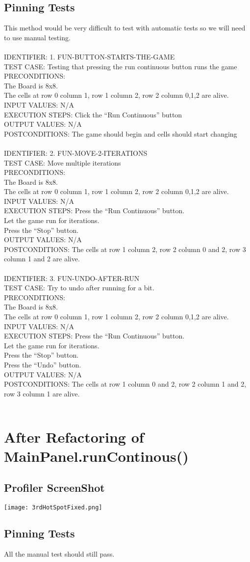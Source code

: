 \documentclass[titlepage]{article}
\newcommand{\testcase}[7]{IDENTIFIER: {#1}\\
TEST CASE: {#2}\\
PRECONDITIONS: {#3}\\
INPUT VALUES: {#4}\\
EXECUTION STEPS: {#5}\\
OUTPUT VALUES: {#6}\\
POSTCONDITIONS: {#7}\\
\\
}
\begin{document}
\subsection{Pinning Tests}
This method would be very difficult to test with automatic tests so we will need to use manual testing.\\
\\
\testcase
{1. FUN-BUTTON-STARTS-THE-GAME}
{Testing that pressing the run continuous button runs the game}
{\\
 The Board is 8x8.\\
 The cells at row 0 column 1, row 1 column 2, row 2 column 0,1,2 are alive.}
{N/A}
{Click the ``Run Continuous'' button}
{N/A}
{The game should begin and cells should start changing}
\testcase
{2. FUN-MOVE-2-ITERATIONS}
{Move multiple iterations}
{\\
 The Board is 8x8.\\
 The cells at row 0 column 1, row 1 column 2, row 2 column 0,1,2 are alive.}
{N/A}
{Press the ``Run Continuous'' button.\\
Let the game run for  iterations.\\
Press the ``Stop'' button.}
{N/A}
{The cells at row 1 column 2, row 2 column 0 and 2, row 3 column 1 and 2 are alive.}
\testcase
{3. FUN-UNDO-AFTER-RUN}
{Try to undo after running for a bit.}
{\\
 The Board is 8x8.\\
 The cells at row 0 column 1, row 1 column 2, row 2 column 0,1,2 are alive.}
{N/A}
{Press the ``Run Continuous'' button.\\
Let the game run for  iterations.\\
Press the ``Stop'' button.\\
Press the ``Undo'' button.}
{N/A}
{The cells at row 1 column 0 and 2, row 2 column 1 and 2, row 3 column 1 are alive.}

\section{After Refactoring of MainPanel.runContinous()}
\subsection{Profiler ScreenShot}
\texttt{[image: 3rdHotSpotFixed.png]}
\subsection{Pinning Tests}
All the manual test should still pass.
\end{document}
